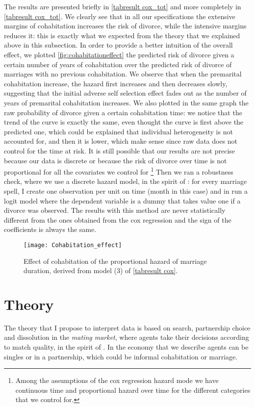 \documentclass[12pt]{article}
\begin{document}
 The results are presented briefly in \autoref{tabresult cox_tot} and more completely in \autoref{tabresult cox_tot}. We clearly see that in all our specifications the extensive margins of cohabitation increases the risk of divorce, while the intensive margins reduces it: this is exactly what we expected from the theory that we explained above in this subsection. In order to provide a better intuition of the overall effect, we plotted \autoref{fig:cohabitationeffect} the predicted risk of divorce given a certain number of years of cohabitation over the predicted risk of divorce of marriages with no previous cohabitation. We observe that when the premarital cohabitation increase, the hazard first increases and then decreases slowly, suggesting that the initial adverse self selection effect fades out as the number of years of premarital cohabitation increases. We also plotted in the same graph the raw probability of divorce given a certain cohabitation time: we notice that the trend of the curve is exactly the same, even thought the curve is first above the predicted one, which could be explained that individual heterogeneity is not accounted for, and then it is lower, which make sense since raw data does not control for the time at risk. It is still possible that our results are not precise because our data is discrete or because the risk of divorce over time is not proportional for all the covariates we control for \footnote{Among the assumptions of the cox regression hazard mode we have continuous time and proportional hazard over time for the different categories that we control for.} Then we ran a robustness check, where we use a discrete hazard model, in the spirit of \citet{jenkins1995}: for every marriage spell, I create one observation per unit on time (month in this case) and in run a logit model where the dependent variable is a dummy that takes value one if a divorce was observed. The results with this method are never statistically different from the ones obtained from the cox regression and the sign of the coefficients is always the same.\\
\begin{figure}[H]
	\centering
	\texttt{[image: Cohabitation\_effect]}
	\caption{Effect of cohabitation of the proportional hazard of marriage duration, derived from model (3) of \autoref{tabresult cox}.}
	\label{fig:cohabitationeffect}
\end{figure}
\section{Theory}
 The theory that I propose to interpret data is based on search, partnership choice and dissolution in the \textit{mating market}, where agents take their decisions according to match quality, in the spirit of \citet{jovanovic1979}. In the economy that we describe agents can be singles or in a partnership, which could be informal cohabitation or marriage.
 
\end{document}
